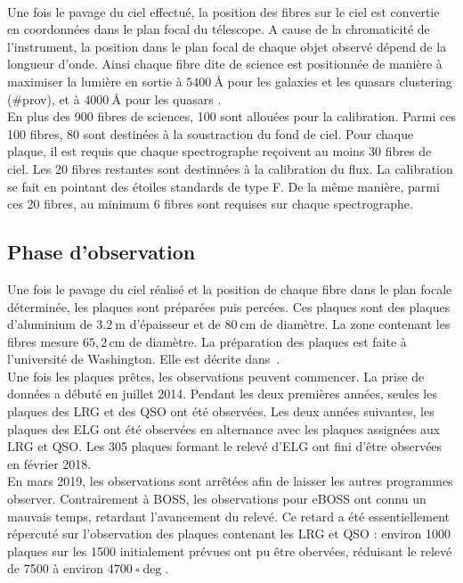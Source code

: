\paragraph{} Une fois le pavage du ciel effectué, la position des fibres sur le ciel est convertie en coordonnées dans le plan focal du télescope. A cause de la chromaticité de l'instrument, la position dans le plan focal de chaque objet observé dépend de la longueur d'onde. Ainsi chaque fibre dite de science est positionnée de manière à maximiser la lumière en sortie à $\SI{5400}{\angstrom}$ pour les galaxies et les quasars clustering (\#prov), et à $\SI{4000}{\angstrom}$ pour les quasars \lya{}. \\
En plus des \num{900} fibres de sciences, \num{100} sont allouées pour la calibration. Parmi ces \num{100} fibres, \num{80} sont destinées à la soustraction du fond de ciel. Pour chaque plaque, il est requis que chaque spectrographe reçoivent au moins \num{30} fibres de ciel. Les \num{20} fibres restantes sont destinnées à la calibration du flux. La calibration se fait en pointant des étoiles standards de type F. De la même manière, parmi ces \num{20} fibres, au minimum \num{6} fibres sont requises sur chaque spectrographe.

\subsection{Phase d'observation}

Une fois le pavage du ciel réalisé et la position de chaque fibre dans le plan focale déterminée, les plaques sont préparées puis percées. Ces plaques sont des plaques d'aluminium de $\SI{3,2}{\meter}$ d'épaisseur et de $\SI{80}{\centi\meter}$ de diamètre. La zone contenant les fibres mesure $65,2\,\mathrm{cm}$ de diamètre. La préparation des plaques est faite à l'université de Washington. Elle est décrite dans~\cite{Blanton2017}.\\
Une fois les plaques prêtes, les observations peuvent commencer. La prise de données a débuté en juillet 2014. Pendant les deux premières années, seules les plaques des LRG et des QSO ont été observées. Les deux années suivantes, les plaques des ELG ont été observées en alternance avec les plaques assignées aux LRG et QSO. Les \num{305} plaques formant le relevé d'ELG ont fini d'être observées en février 2018. \\
En mars 2019, les observations sont arrêtées afin de laisser les autres programmes observer. Contrairement à BOSS, les observations pour eBOSS ont connu un mauvais temps, retardant l'avancement du relevé. Ce retard a été essentiellement répercuté sur l'observation des plaques contenant les LRG et QSO : environ \num{1000} plaques sur les \num{1500} initialement prévues ont pu être obervées, réduisant le relevé de \num{7500} à environ $\SI{4700}{\square\deg}$.


